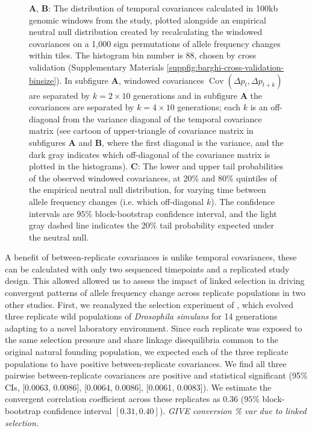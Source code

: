 \documentclass[11pt]{article}
\newcommand{\gc}[1]{{\it \color{red} #1 } }
\DeclareMathOperator{\cov}{Cov}
\begin{document}
\begin{figure}[!htb]
  \caption{{\bf A}, {\bf B}: The distribution of temporal covariances
    calculated in 100kb genomic windows from the \textcite{Barghi2019-qy}
    study, plotted alongside an empirical neutral null distribution created by
    recalculating the windowed covariances on a 1,000 sign permutations of
    allele frequency changes within tiles. The histogram bin number is 88,
    chosen by cross validation (Supplementary Materials
    \ref{suppfig:barghi-cross-validation-binsize}). In subfigure {\bf A}, windowed
    covariances $\cov(\Delta p_t, \Delta p_{t+k})$ are separated by $k=2 \times
    10$ generations and in subfigure {\bf A} the covariances are separated by $k=4
    \times 10$ generations; each $k$ is an off-diagonal from the variance
    diagonal of the temporal covariance matrix (see cartoon of upper-triangle
    of covariance matrix in subfigures {\bf A} and {\bf B}, where the first diagonal is the
    variance, and the dark gray indicates which off-diagonal of the covariance
    matrix is plotted in the histograms). {\bf C}: The lower and upper tail
    probabilities of the observed windowed covariances, at 20\% and 80\%
    quintiles of the empirical neutral null distribution, for varying time
    between allele frequency changes (i.e. which off-diagonal $k$). The
  confidence intervals are  $95\%$ block-bootstrap confidence interval, and the
light gray dashed line indicates the 20\% tail probability expected under the
neutral null.}
  
    \label{fig:figure-3} 
\end{figure}


A benefit of between-replicate covariances is unlike temporal covariances,
these can be calculated with only two sequenced timepoints and a replicated
study design. This allowed allowed us to assess the impact of linked selection
in driving convergent patterns of allele frequency change across replicate
populations in two other studies. First, we reanalyzed the selection experiment
of \textcite{Kelly2019-dc}, which evolved three replicate wild populations of
\emph{Drosophila simulans} for 14 generations adapting to a novel laboratory
environment. Since each replicate was exposed to the same selection pressure
and share linkage disequilibria common to the original natural founding
population, we expected each of the three replicate populations to have
positive between-replicate covariances. We find all three pairwise
between-replicate covariances are positive and statistical significant (95\%
CIs, [0.0063, 0.0086], [0.0064, 0.0086], [0.0061, 0.0083]). We estimate the
convergent correlation coefficient across these replicates as 0.36 ($95\%$
block-bootstrap confidence interval $[0.31, 0.40]$). \gc{GIVE conversion \% var
due to linked selection. }
\end{document}
